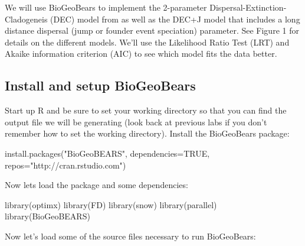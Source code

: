\documentclass[11pt]{article}
\begin{document}
We will use BioGeoBears to implement the
2-parameter Dispersal-Extinction-Cladogeneis (DEC) 
model from \citet{ree2008maximum}
as well as the DEC+J model that includes
a long distance dispersal 
(jump or founder event speciation)
parameter.
See Figure 1 for details on the different models.
We'll use the Likelihood Ratio Test (LRT) and
Akaike information criterion (AIC)
to see which model fits the data better.

\subsection{Install and setup BioGeoBears}

Start up R and be sure to set your working directory so that you can
find the output file we will be generating (look back at
previous labs if you don't remember how to set the working directory). 
Install the BioGeoBears package:
\begin{code}
install.packages("BioGeoBEARS", dependencies=TRUE, repos="http://cran.rstudio.com")
\end{code}
Now lets load the package and some dependencies:
\begin{code}
library(optimx)
library(FD)
library(snow)
library(parallel)
library(BioGeoBEARS)
\end{code}
Now let's load some of the source files necessary to run BioGeoBears:
\end{document}
